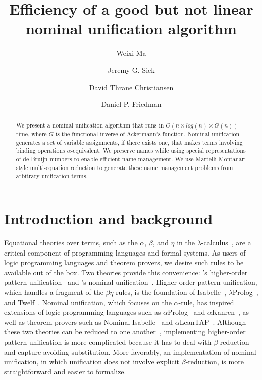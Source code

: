 \documentclass[a4paper,UKenglish]{lipics-v2016}
\title{Efficiency of a good but not linear nominal unification algorithm}
\author[1]{Weixi Ma}
\author[2]{Jeremy G. Siek}
\author[3]{David Thrane Christiansen}
\author[4]{Daniel P. Friedman}
\affil[1]{Indiana University,
  \texttt{mvc@iu.edu}}
\affil[2]{Indiana University,
  \texttt{jsiek@indiana.edu}}
\affil[3]{Galois, Inc.,
  \texttt{dtc@galois.com}}
\affil[4]{Indiana University,
  \texttt{dfried@indiana.edu}}
\begin{document}
\maketitle

\begin{abstract}
  We present a nominal unification algorithm that runs in $O(n \times
  log(n) \times G(n))$ time, where $G$ is the functional inverse of
  Ackermann's function.  Nominal unification generates a set of
  variable assignments, if there exists one, that makes terms
  involving binding operations $\alpha$-equivalent. We preserve names
  while using special representations of de Bruijn numbers
  to enable efficient name management.
  We use Martelli-Montanari style multi-equation reduction
  to generate these name management problems from arbitrary unification terms.
\end{abstract}

\section{Introduction and background}

Equational theories over terms, such as the $\alpha$, $\beta$, and $\eta$
in the $\lambda$-calculus~\citep{church_calculi_1941}, are
a critical component of
programming languages and formal systems.  As users of logic
programming languages and theorem provers, we desire such rules to be
available out of the box. Two theories provide
this convenience: \citeauthor{miller_logic_1989}'s higher-order pattern unification~\citep{miller_logic_1989} and \citeauthor{urban_nominal_2004}'s nominal unification~\citep{urban_nominal_2004}. Higher-order pattern unification, which
handles a fragment of the $\beta\eta$-rules, is the foundation of
Isabelle~\citep{paulson_natural_1986},
$\lambda$Prolog~\citep{nadathur_overview_1988}, and
Twelf~\citep{pfenning_system_1999}.  Nominal unification, which
focuses on the $\alpha$-rule, has inspired extensions of logic
programming languages such as $\alpha$Prolog~\citep{cheney_prolog:_2004}
and $\alpha$Kanren~\citep{byrd_kanren_2007}, as well as theorem
provers such as Nominal Isabelle~\citep{urban_nominal_2005} and
$\alpha$LeanTAP~\citep{near_leantap:_2008}.  Although these two
theories can be reduced to one another~\citep{cheney_relating_2005,
  levy_nominal_2012}, implementing higher-order pattern unification is
more complicated because it has to deal with $\beta$-reduction and
capture-avoiding substitution. More favorably, an implementation of
nominal unification,
in which unification does not involve explicit $\beta$-reduction,
is more straightforward and easier to formalize.
\end{document}
